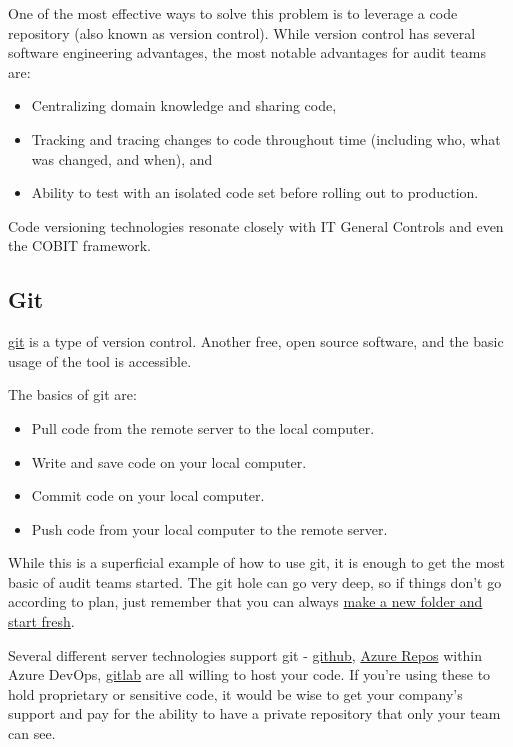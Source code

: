 \documentclass[
]{book}
\providecommand{\tightlist}{%
  \setlength{\itemsep}{0pt}\setlength{\parskip}{0pt}}
\begin{document}
One of the most effective ways to solve this problem is to leverage a code repository (also known as version control). While version control has several software engineering advantages, the most notable advantages for audit teams are:

\begin{itemize}
\tightlist
\item
  Centralizing domain knowledge and sharing code,
\item
  Tracking and tracing changes to code throughout time (including who, what was changed, and when), and
\item
  Ability to test with an isolated code set before rolling out to production.
\end{itemize}

Code versioning technologies resonate closely with IT General Controls and even the COBIT framework.

\hypertarget{git}{%
\subsection{Git}\label{git}}

\href{https://git-scm.com}{git} is a type of version control. Another free, open source software, and the basic usage of the tool is accessible.

The basics of git are:

\begin{itemize}
\tightlist
\item
  Pull code from the remote server to the local computer.
\item
  Write and save code on your local computer.
\item
  Commit code on your local computer.
\item
  Push code from your local computer to the remote server.
\end{itemize}

While this is a superficial example of how to use git, it is enough to get the most basic of audit teams started. The git hole can go very deep, so if things don't go according to plan, just remember that you can always \href{https://xkcd.com/1597/}{make a new folder and start fresh}.

Several different server technologies support git - \href{https://github.com}{github}, \href{https://azure.microsoft.com/en-us/services/devops/repos/}{Azure Repos} within Azure DevOps, \href{https://gitlab.com}{gitlab} are all willing to host your code. If you're using these to hold proprietary or sensitive code, it would be wise to get your company's support and pay for the ability to have a private repository that only your team can see.
\end{document}
